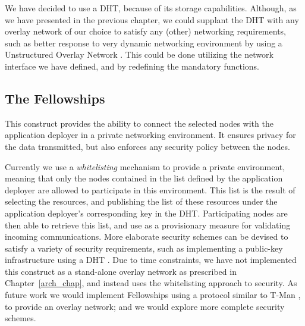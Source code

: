 \documentclass[12pt, titlepage]{uo_temp}
\begin{document}
     We have decided to use a DHT, because of its storage capabilities. Although, as we
     have presented in the previous chapter, we could supplant the DHT with any overlay
     network of our choice to satisfy any (other) networking requirements, such as better
     response to very dynamic networking environment by using a Unstructured Overlay
     Network \cite{lua2005survey}. This could be done utilizing the network interface we
     have defined, and by redefining the mandatory functions.


     \subsection{The Fellowships}
     This construct provides the ability to connect the selected nodes
     with the application deployer in a private networking environment. It ensures privacy
     for the data transmitted, but also enforces any security policy between the nodes.

     Currently we use a \emph{whitelisting} mechanism to provide a private environment,
     meaning that only the nodes contained in the list defined by the application deployer
     are allowed to participate in this environment. This list is the result of selecting
     the resources, and publishing the list of these resources under the application
     deployer's corresponding key in the DHT.
     Participating nodes are then able to retrieve this list, and use as a provisionary
     measure for validating incoming communications. More elaborate security schemes can
     be devised to satisfy a variety of security requirements, such as implementing a
     public-key infrastructure using a DHT \cite{luo2011self}. Due to time constraints, we
     have not implemented this construct as a stand-alone overlay network as prescribed in
     Chapter~\ref{arch_chap}, and instead uses the whitelisting approach to security. As
     future work we would implement Fellowships using a protocol similar to T-Man
     \cite{jelasity2009t}, to provide an overlay network; and we would explore more
     complete security schemes.
\end{document}
